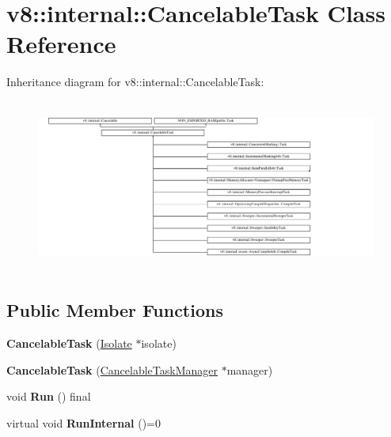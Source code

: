 \hypertarget{classv8_1_1internal_1_1CancelableTask}{}\section{v8\+:\+:internal\+:\+:Cancelable\+Task Class Reference}
\label{classv8_1_1internal_1_1CancelableTask}
Inheritance diagram for v8\+:\+:internal\+:\+:Cancelable\+Task\+:\begin{figure}[H]
\begin{center}
\leavevmode
\includegraphics[height=5.728900cm]{classv8_1_1internal_1_1CancelableTask}
\end{center}
\end{figure}
\subsection*{Public Member Functions}
\begin{DoxyCompactItemize}
\item 
\mbox{\label{classv8_1_1internal_1_1CancelableTask_aab16ea25b9ec26827f565eed805d6077}} 
{\bfseries Cancelable\+Task} (\mbox{\hyperlink{classv8_1_1internal_1_1Isolate}{Isolate}} $\ast$isolate)
\item 
\mbox{\label{classv8_1_1internal_1_1CancelableTask_a7386c525fd15802ce95deef2bbc292bd}} 
{\bfseries Cancelable\+Task} (\mbox{\hyperlink{classv8_1_1internal_1_1CancelableTaskManager}{Cancelable\+Task\+Manager}} $\ast$manager)
\item 
\mbox{\label{classv8_1_1internal_1_1CancelableTask_ae1851dd66f2539be51f60f2ad041af0d}} 
void {\bfseries Run} () final
\item 
\mbox{\label{classv8_1_1internal_1_1CancelableTask_a9c4f61742dcb132b5b631e7bfce3242c}} 
virtual void {\bfseries Run\+Internal} ()=0
\end{DoxyCompactItemize}
